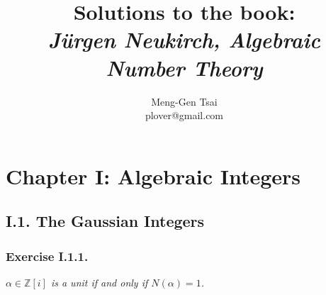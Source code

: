 \documentclass{article}
\title{\textbf{Solutions to the book: \\\emph{J\"{u}rgen Neukirch, Algebraic Number Theory}}}
\author{Meng-Gen Tsai \\ plover@gmail.com}
\begin{document}
\maketitle
\tableofcontents












\newpage
\section*{Chapter I: Algebraic Integers \\}



\subsection*{I.1. The Gaussian Integers \\}


\subsubsection*{Exercise I.1.1.}
\emph{$\alpha \in \mathbb{Z}[i]$ is a unit if and only if $N(\alpha) = 1$.} \\
\end{document}
